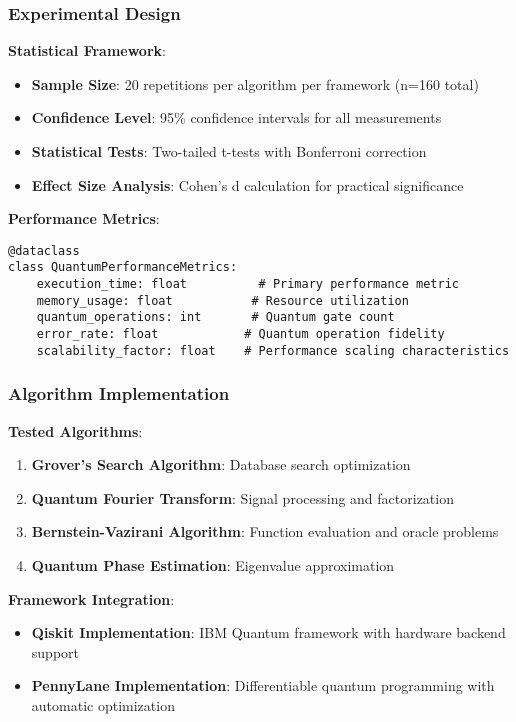 \documentclass[12pt,a4paper]{article}
\begin{document}
\subsubsection{Experimental Design}

\textbf{Statistical Framework}:
\begin{itemize}
\item \textbf{Sample Size}: 20 repetitions per algorithm per framework (n=160 total)
\item \textbf{Confidence Level}: 95\% confidence intervals for all measurements
\item \textbf{Statistical Tests}: Two-tailed t-tests with Bonferroni correction
\item \textbf{Effect Size Analysis}: Cohen's d calculation for practical significance
\end{itemize}

\textbf{Performance Metrics}:
\begin{lstlisting}
@dataclass
class QuantumPerformanceMetrics:
    execution_time: float          # Primary performance metric
    memory_usage: float           # Resource utilization
    quantum_operations: int       # Quantum gate count
    error_rate: float            # Quantum operation fidelity
    scalability_factor: float    # Performance scaling characteristics
\end{lstlisting}

\subsubsection{Algorithm Implementation}

\textbf{Tested Algorithms}:
\begin{enumerate}
\item \textbf{Grover's Search Algorithm}: Database search optimization
\item \textbf{Quantum Fourier Transform}: Signal processing and factorization
\item \textbf{Bernstein-Vazirani Algorithm}: Function evaluation and oracle problems
\item \textbf{Quantum Phase Estimation}: Eigenvalue approximation
\end{enumerate}

\textbf{Framework Integration}:
\begin{itemize}
\item \textbf{Qiskit Implementation}: IBM Quantum framework with hardware backend support
\item \textbf{PennyLane Implementation}: Differentiable quantum programming with automatic optimization
\end{itemize}
\end{document}
